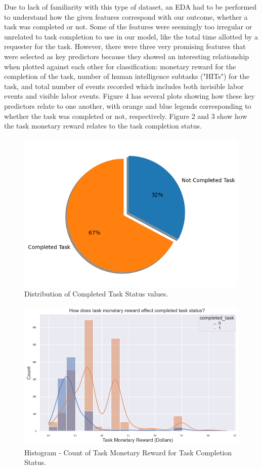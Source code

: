 \documentclass[11pt]{article}
\begin{document}
Due to lack of familiarity with this type of dataset, an EDA had to be performed to understand how the given features correspond with our outcome, whether a task was completed or not. Some of the features were seemingly too irregular or unrelated to task completion to use in our model, like the total time allotted by a requester for the task. However, there were three very promising features that were selected as key predictors because they showed an interesting relationship when plotted against each other for classification: monetary reward for the completion of the task, number of human intelligence subtasks ("HITs") for the task, and total number of events recorded which includes both invisible labor events and visible labor events. Figure 4 has several plots showing how these key predictors relate to one another, with orange and blue legends corresponding to whether the task was completed or not, respectively. Figure 2 and 3 show how the task monetary reward relates to the task completion status.

\begin{figure}[hbt!]
  \centering
  \includegraphics[width=330pt]{figures/distribution-completed-tasks-pie-chart}
  \caption{Distribution of Completed Task Status values.}
\end{figure}

\begin{figure}[hbt!]
  \centering
  \includegraphics[width=\linewidth]{figures/task-monetary_reward_in_dollars-vs-completed_task-histogram}
  \caption{Histogram - Count of Task Monetary Reward for Task Completion Status.}
\end{figure}
\end{document}
